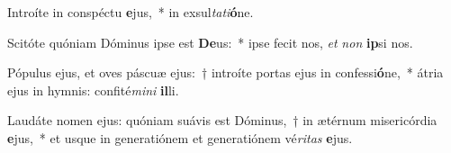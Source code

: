 \item Introíte in conspéctu \textbf{e}jus,~* in exsul\textit{ta}\textit{ti}\textbf{ó}ne.
\item Scitóte quóniam Dóminus ipse est \textbf{De}us:~* ipse fecit nos, \textit{et} \textit{non} \textbf{ip}si nos.
\item Pópulus ejus, et oves páscuæ ejus:~† introíte portas ejus in confessi\textbf{ó}ne,~* átria ejus in hymnis: confité\textit{mi}\textit{ni} \textbf{il}li.
\item Laudáte nomen ejus: quóniam suávis est Dóminus,~† in ætérnum misericórdia \textbf{e}jus,~* et usque in generatiónem et generatiónem vé\textit{ri}\textit{tas} \textbf{e}jus.
